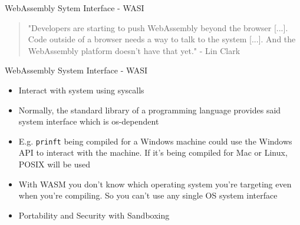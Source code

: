 \documentclass{beamer}
\begin{document}
\begin{frame}{WebAssembly Sytem Interface - WASI}
    \begin{quotation}
        "Developers are starting to push WebAssembly beyond the browser [...]. Code outside of a browser needs a way to talk to the system [...]. And the WebAssembly platform doesn’t have that yet." - Lin Clark
    \end{quotation}
\end{frame}

\begin{frame}{WebAssembly System Interface - WASI}
\begin{itemize} 
    \item Interact with system using syscalls
    \item Normally, the standard library of a programming language provides said system interface which is os-dependent
    \item E.g. \lstinline{prinft} being compiled for a Windows machine could use the Windows API to interact with the machine. If it's being compiled for Mac or Linux, POSIX will be used
    \item With WASM you don't know which operating system you're targeting even when you're compiling. So you can't use any single OS system interface 
    \item Portability and Security with Sandboxing
\end{itemize}
\end{frame}
\end{document}
